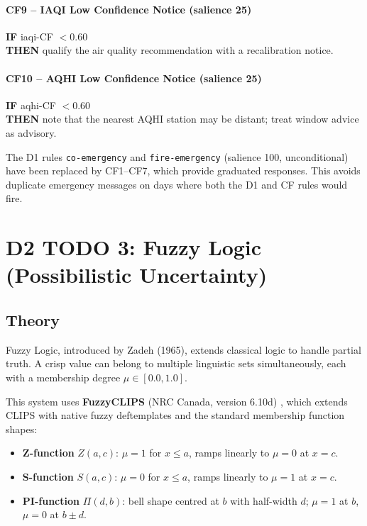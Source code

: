 \documentclass{article}
\begin{document}
\paragraph{CF9 -- IAQI Low Confidence Notice (salience 25)}
\textbf{IF} iaqi-CF $< 0.60$ \\
\textbf{THEN} qualify the air quality recommendation with a recalibration notice.

\paragraph{CF10 -- AQHI Low Confidence Notice (salience 25)}
\textbf{IF} aqhi-CF $< 0.60$ \\
\textbf{THEN} note that the nearest AQHI station may be distant; treat window advice as advisory.

The D1 rules \texttt{co-emergency} and \texttt{fire-emergency} (salience 100, unconditional) have been replaced by CF1--CF7, which provide graduated responses. This avoids duplicate emergency messages on days where both the D1 and CF rules would fire.



\section{D2 TODO 3: Fuzzy Logic (Possibilistic Uncertainty)}

\subsection{Theory}

Fuzzy Logic, introduced by Zadeh (1965), extends classical logic to handle partial truth. A crisp value can belong to multiple linguistic sets simultaneously, each with a membership degree $\mu \in [0.0, 1.0]$.

This system uses \textbf{FuzzyCLIPS} (NRC Canada, version 6.10d) \cite{fuzzyclips}, which extends CLIPS with native fuzzy deftemplates and the standard membership function shapes:

\begin{itemize}
    \item \textbf{Z-function} $Z(a, c)$: $\mu = 1$ for $x \leq a$, ramps linearly to $\mu = 0$ at $x = c$.
    \item \textbf{S-function} $S(a, c)$: $\mu = 0$ for $x \leq a$, ramps linearly to $\mu = 1$ at $x = c$.
    \item \textbf{PI-function} $\Pi(d, b)$: bell shape centred at $b$ with half-width $d$; $\mu = 1$ at $b$, $\mu = 0$ at $b \pm d$.
\end{itemize}
\end{document}
